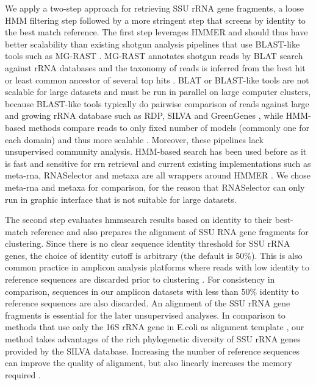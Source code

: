 \documentclass[]{msu-thesis}
\begin{document}
We apply a two-step approach for retrieving SSU rRNA gene fragments, a loose HMM filtering step followed by a more stringent step that screens by identity to the best match reference. The first step leverages HMMER \cite{eddy_new_2009} and should thus have better scalability than existing shotgun analysis pipelines that use BLAST-like tools such as MG-RAST \cite{sunagawa_metagenomic_2013}. MG-RAST annotates shotgun reads by BLAT search against rRNA databases and the taxonomy of reads is inferred from the best hit or least common ancestor of several top hits \cite{meyer_metagenomics_2008,altschul_gapped_1997,kent_blatblast-like_2002}. BLAT or BLAST-like tools are not scalable for large datasets and must be run in parallel on large computer clusters, because BLAST-like tools typically do pairwise comparison of reads against large and growing rRNA database such as RDP, SILVA and GreenGenes \cite{cole_ribosomal_2014,quast_silva_2013,desantis_greengenes_2006}, while HMM-based methods compare reads to only fixed number of models (commonly one for each domain) and thus more scalable \cite{sunagawa_metagenomic_2013}. Moreover, these pipelines lack unsupervised community analysis. HMM-based search has been used before as it is fast and sensitive for rrn retrieval \cite{huang_identification_2009,           lee_rrnaselector:_2011,bengtsson_metaxa:_2011,shah_comparing_2011} and current existing implementations such as meta-rna, RNASelector and metaxa are all wrappers around HMMER \cite{eddy_new_2009}. We chose meta-rna and metaxa for comparison, for the reason that RNASelector can only run in graphic interface that is not suitable for large datasets.

The second step evaluates hmmsearch results based on identity to their best-match reference and also prepares the alignment of SSU RNA gene fragments for clustering. Since there is no clear sequence identity threshold for SSU rRNA genes, the choice of identity cutoff is arbitrary (the default is 50\%). This is also common practice in amplicon analysis platforms where reads with low identity to reference sequences are discarded prior to clustering \cite{schloss_introducing_2009,kuczynski_using_2012}. For consistency in comparison, sequences in our amplicon datasets with less than 50\% identity to reference sequences are also discarded. An alignment of the SSU rRNA gene fragments is essential for the later unsupervised analyses. In comparison to methods that use only the 16S rRNA gene in E.coli as alignment template \cite{luo_soil_2014}, our method takes advantages of the rich phylogenetic diversity of SSU rRNA genes provided by the SILVA database. Increasing the number of reference sequences can improve the quality of alignment, but also linearly increases the memory required \cite{schloss_high-throughput_2009,caporaso_pynast:_2010}.
\end{document}
